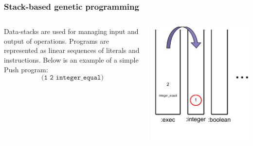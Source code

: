 \documentclass{beamer}
\newcommand{\linespace}{\vskip 0.25cm}
\begin{document}
\begin{frame}
	\frametitle{Stack-based genetic programming}
	\begin{columns}
		\begin{column}{0.6\textwidth}
			Data-stacks are used for managing input and output of operations.
			\linespace
			\linespace
			\linespace
			Programs are represented as linear sequences of literals and instructions. Below is an example of a simple Push program:
			\[\texttt{(1 2 integer\_equal)}\]
		\end{column}
		\begin{column}{0.4\textwidth}
			\includegraphics[height=1.2\textwidth]{Illustrations/stack_3.PDF}
		\end{column}
	\end{columns}
\end{frame}
\end{document}
